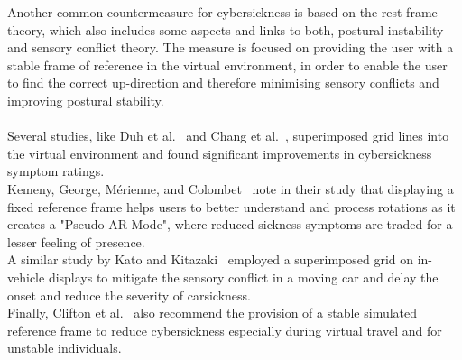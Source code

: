 Another common countermeasure for cybersickness is based on the rest frame theory, which also includes some aspects and
links to both, postural instability and sensory conflict theory.
The measure is focused on providing the user with a stable frame of reference in the virtual environment, in order
to enable the user to find the correct up-direction and therefore minimising sensory conflicts and improving postural
stability.
\\
\\
Several studies, like Duh et al.~\cite{Duh2001b} and Chang et al.~\cite{Chang2013}, superimposed grid lines into the
virtual environment and found significant improvements in cybersickness symptom ratings.
\\
Kemeny, George, M\'erienne, and Colombet~\cite{Kemeny2017} note in their study that displaying a fixed reference
frame helps users to better understand and process rotations as it creates a "Pseudo AR Mode", where reduced sickness
symptoms are traded for a lesser feeling of presence.
\\
A similar study by Kato and Kitazaki~\cite{Kato2008} employed a superimposed grid on in-vehicle displays to mitigate
the sensory conflict in a moving car and delay the onset and reduce the severity of carsickness.
\\
Finally, Clifton et al.~\cite{Clifton2020} also recommend the provision of a stable simulated reference frame to
reduce cybersickness especially during virtual travel and for unstable individuals.
